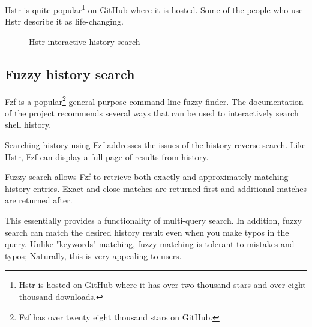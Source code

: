 Hstr is quite popular\footnote{Hstr is hosted on GitHub where it has over two thousand stars and over eight thousand downloads. } on GitHub where it is hosted. Some of the people who use Hstr describe it as life-changing.

\begin{figure}[]
  \caption{Hstr interactive history search}
  \label{hstr-screenshot}
\end{figure}


\subsection{Fuzzy history search}

Fzf\cite{tools-fzf} is a popular\footnote{Fzf has over twenty eight thousand stars on GitHub.} general-purpose command-line fuzzy finder. The documentation of the project recommends several ways that can be used to interactively search shell history.

Searching history using Fzf addresses the issues of the history reverse search. 
Like Hstr, Fzf can display a full page of results from history. 

Fuzzy search allows Fzf to retrieve both exactly and approximately matching history entries. Exact and close matches are returned first and additional matches are returned after. 

This essentially provides a functionality of multi-query search. In addition, fuzzy search can match the desired history result even when you make typos in the query. Unlike "keywords" matching, fuzzy matching is tolerant to mistakes and typos; Naturally, this is very appealing to users. 

